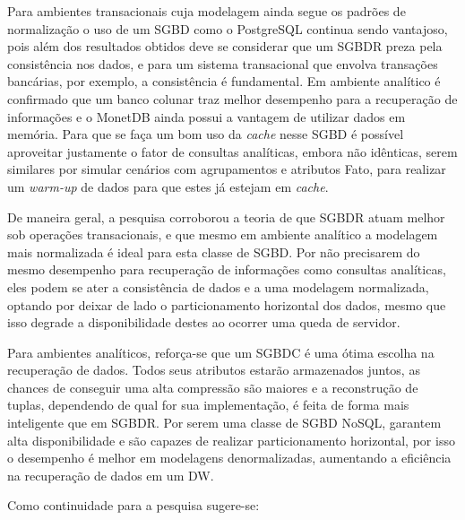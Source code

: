 Para ambientes transacionais cuja modelagem ainda segue os padrões de normalização o uso de um SGBD como o PostgreSQL continua sendo vantajoso, pois além dos resultados obtidos deve se considerar que um SGBDR preza pela consistência nos dados, e para um sistema transacional que envolva transações bancárias, por exemplo, a consistência é fundamental. Em ambiente analítico é confirmado que um banco colunar traz melhor desempenho para a recuperação de informações e o MonetDB ainda possui a vantagem de utilizar dados em memória. Para que se faça um bom uso da \textit{cache} nesse SGBD é possível aproveitar justamente o fator de consultas analíticas, embora não idênticas, serem similares por simular cenários com agrupamentos e atributos Fato, para realizar um \textit{warm-up} de dados para que estes já estejam em \textit{cache}.

De maneira geral, a pesquisa corroborou a teoria de que SGBDR atuam melhor sob operações transacionais, e que mesmo em ambiente analítico a modelagem mais normalizada é ideal para esta classe de SGBD. Por não precisarem do mesmo desempenho para recuperação de informações como consultas analíticas, eles podem se ater a consistência de dados e a uma modelagem normalizada, optando por deixar de lado o particionamento horizontal dos dados, mesmo que isso degrade a disponibilidade destes ao ocorrer uma queda de servidor.

Para ambientes analíticos, reforça-se que um SGBDC é uma ótima escolha na recuperação de dados. Todos seus atributos estarão armazenados juntos, as chances de conseguir uma alta compressão são maiores e a reconstrução de tuplas, dependendo de qual for sua implementação, é feita de forma mais inteligente que em SGBDR. Por serem uma classe de SGBD NoSQL, garantem alta disponibilidade e são capazes de realizar particionamento horizontal, por isso o desempenho é melhor em modelagens denormalizadas, aumentando a eficiência na recuperação de dados em um DW.


Como continuidade para a pesquisa sugere-se:

